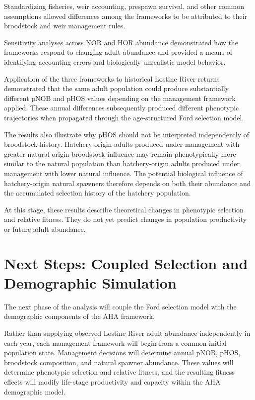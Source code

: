 \documentclass[12pt,letterpaper]{article}
\begin{document}
Standardizing fisheries, weir accounting, prespawn survival, and other common
assumptions allowed differences among the frameworks to be attributed to their
broodstock and weir management rules.

Sensitivity analyses across NOR and HOR abundance demonstrated how the
frameworks respond to changing adult abundance and provided a means of
identifying accounting errors and biologically unrealistic model behavior.

Application of the three frameworks to historical Lostine River returns
demonstrated that the same adult population could produce substantially
different pNOB and pHOS values depending on the management framework applied.
These annual differences subsequently produced different phenotypic
trajectories when propagated through the age-structured Ford selection model.

The results also illustrate why pHOS should not be interpreted independently
of broodstock history. Hatchery-origin adults produced under management with
greater natural-origin broodstock influence may remain phenotypically more
similar to the natural population than hatchery-origin adults produced under
management with lower natural influence. The potential biological influence
of hatchery-origin natural spawners therefore depends on both their abundance
and the accumulated selection history of the hatchery population.

At this stage, these results describe theoretical changes in phenotypic
selection and relative fitness. They do not yet predict changes in population
productivity or future adult abundance.

\section{Next Steps: Coupled Selection and Demographic Simulation}\label{next-steps-coupled-selection-and-demographic-simulation}

The next phase of the analysis will couple the Ford selection model with the
demographic components of the AHA framework.

Rather than supplying observed Lostine River adult abundance independently in
each year, each management framework will begin from a common initial
population state. Management decisions will determine annual pNOB, pHOS,
broodstock composition, and natural spawner abundance. These values will
determine phenotypic selection and relative fitness, and the resulting fitness
effects will modify life-stage productivity and capacity within the AHA
demographic model.
\end{document}
